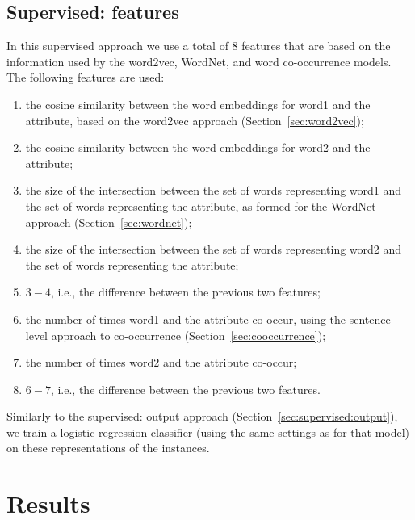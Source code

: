 \documentclass[11pt,a4paper]{article}
\newcommand{\secref}[1]{Section~\ref{#1}}
\begin{document}
\subsection{Supervised: features}

In this supervised approach we use a total of 8 features that are
based on the information used by the word2vec, WordNet, and word
co-occurrence models. The following features are used:

\begin{enumerate}

\item the cosine similarity between the word embeddings for word1 and
  the attribute, based on the word2vec approach
  (\secref{sec:word2vec});

\item the cosine similarity between the word embeddings for word2 and
  the attribute;

\item the size of the intersection between the set of words
  representing word1 and the set of words representing the attribute,
  as formed for the WordNet approach (\secref{sec:wordnet});

\item the size of the intersection between the set of words
  representing word2 and the set of words representing the attribute;

\item $3 - 4$, i.e., the difference between the previous two
  features;

\item the number of times word1 and the attribute co-occur, using the
  sentence-level approach to co-occurrence
  (\secref{sec:cooccurrence});

\item the number of times word2 and the attribute co-occur;

\item $6 - 7$, i.e., the difference between the previous two features.

\end{enumerate}

\noindent
Similarly to the supervised: output approach
(\secref{sec:supervised:output}), we train a logistic regression
classifier (using the same settings as for that model) on these
representations of the instances.

\section{Results\label{sec:results}}
\end{document}

